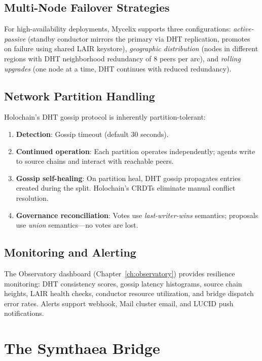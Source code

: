 \documentclass[12pt]{book}
\begin{document}
\section{Multi-Node Failover Strategies}

For high-availability deployments, Mycelix supports three configurations:
\emph{active-passive} (standby conductor mirrors the primary via DHT
replication, promotes on failure using shared LAIR keystore),
\emph{geographic distribution} (nodes in different regions with DHT
neighborhood redundancy of 8 peers per arc), and \emph{rolling upgrades}
(one node at a time, DHT continues with reduced redundancy).

\section{Network Partition Handling}

Holochain's DHT gossip protocol is inherently partition-tolerant:

\begin{enumerate}
  \item \textbf{Detection}: Gossip timeout (default 30 seconds).
  \item \textbf{Continued operation}: Each partition operates
    independently; agents write to source chains and interact
    with reachable peers.
  \item \textbf{Gossip self-healing}: On partition heal, DHT gossip
    propagates entries created during the split.  Holochain's CRDTs
    eliminate manual conflict resolution.
  \item \textbf{Governance reconciliation}: Votes use
    \emph{last-writer-wins} semantics; proposals use \emph{union}
    semantics---no votes are lost.
\end{enumerate}

\section{Monitoring and Alerting}

The Observatory dashboard (Chapter~\ref{ch:observatory}) provides
resilience monitoring: DHT consistency scores, gossip latency
histograms, source chain heights, LAIR health checks, conductor
resource utilization, and bridge dispatch error rates.  Alerts
support webhook, Mail cluster email, and LUCID push notifications.


\chapter{The Symthaea Bridge}
\end{document}
